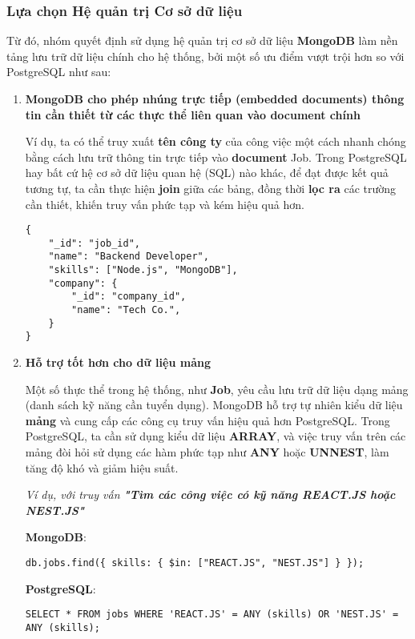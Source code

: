 \subsubsection{Lựa chọn Hệ quản trị Cơ sở dữ liệu}

Từ đó, nhóm quyết định sử dụng hệ quản trị cơ sở dữ liệu \textbf{MongoDB} làm nền tảng lưu trữ dữ liệu chính cho hệ thống, bởi một số ưu điểm vượt trội hơn so với PostgreSQL như sau:

\begin{enumerate}
    \item \textbf{MongoDB cho phép nhúng trực tiếp (embedded documents) thông tin cần thiết từ các thực thể liên quan vào document chính}
    
    Ví dụ, ta có thể truy xuất \textbf{tên công ty} của công việc một cách nhanh chóng bằng cách lưu trữ thông tin trực tiếp vào \textbf{document }Job. Trong PostgreSQL hay bất cứ hệ cơ sở dữ liệu quan hệ (SQL) nào khác, để đạt được kết quả tương tự, ta cần thực hiện \textbf{join} giữa các bảng, đồng thời \textbf{lọc ra} các trường cần thiết, khiến truy vấn phức tạp và kém hiệu quả hơn.
    \begin{lstlisting}[numbers=none]
{
    "_id": "job_id",
    "name": "Backend Developer",
    "skills": ["Node.js", "MongoDB"],
    "company": {
        "_id": "company_id",
        "name": "Tech Co.",
    }
}
    \end{lstlisting}

    \item \textbf{Hỗ trợ tốt hơn cho dữ liệu mảng}
    
    Một số thực thể trong hệ thống, như \textbf{Job}, yêu cầu lưu trữ dữ liệu dạng mảng (danh sách kỹ năng cần tuyển dụng). MongoDB hỗ trợ tự nhiên kiểu dữ liệu \textbf{mảng} và cung cấp các công cụ truy vấn hiệu quả hơn PostgreSQL. Trong PostgreSQL, ta cần sử dụng kiểu dữ liệu \textbf{ARRAY}, và việc truy vấn trên các mảng đòi hỏi sử dụng các hàm phức tạp như \textbf{ANY} hoặc \textbf{UNNEST}, làm tăng độ khó và giảm hiệu suất.
    
    \textit{Ví dụ, với truy vấn \textbf{"Tìm các công việc có kỹ năng REACT.JS hoặc NEST.JS"}}
    
    \textbf{MongoDB}:
    \begin{lstlisting}[numbers=none]
db.jobs.find({ skills: { $in: ["REACT.JS", "NEST.JS"] } });
    \end{lstlisting}
    
    \textbf{PostgreSQL}:
    \begin{lstlisting}[numbers=none]
SELECT * FROM jobs WHERE 'REACT.JS' = ANY (skills) OR 'NEST.JS' = ANY (skills);
    \end{lstlisting}


\end{enumerate}
